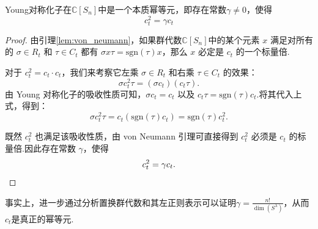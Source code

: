 \begin{theorem}[$c_t$是本质幂等元]
    Young对称化子在$\mathbb{C}[S_n]$中是一个本质幂等元，即存在常数$\gamma\neq 0$，使得
    \begin{equation*}
        c_t^2=\gamma c_t
    \end{equation*}
\end{theorem}
\begin{proof}
    由引理\ref{lem:von_neumann}，如果群代数$\mathbb{C}[S_n]$中的某个元素 $x$ 满足对所有的 $\sigma \in R_t$ 和 $\tau \in C_t$ 都有 $\sigma x \tau = \mathrm{sgn}(\tau) x$，那么 $x$ 必定是 $c_t$ 的一个标量倍.
    
    对于 $c_t^2 = c_t \cdot c_t$，我们来考察它左乘 $\sigma \in R_t$ 和右乘 $\tau \in C_t$ 的效果：
    \begin{equation*}
        \sigma c_t^2 \tau = (\sigma c_t) (c_t \tau).
    \end{equation*}
    由 Young 对称化子的吸收性质可知，$\sigma c_t = c_t$ 以及 $c_t \tau = \mathrm{sgn}(\tau) c_t$.将其代入上式，得到：
    \begin{equation*}
        \sigma c_t^2 \tau = c_t (\mathrm{sgn}(\tau)c_t) = \mathrm{sgn}(\tau) c_t^2.
    \end{equation*}
    
    既然 $c_t^2$ 也满足该吸收性质，由 von Neumann 引理可直接得到 $c_t^2$ 必须是 $c_t$ 的标量倍.因此存在常数 $\gamma$，使得
    \begin{equation*}
        c_t^2 = \gamma c_t. \qedhere
    \end{equation*}
\end{proof}
事实上，进一步通过分析置换群代数和其左正则表示可以证明$\gamma = \frac{n!}{\dim(S^\lambda)}$，从而$c_t$是真正的幂等元.
